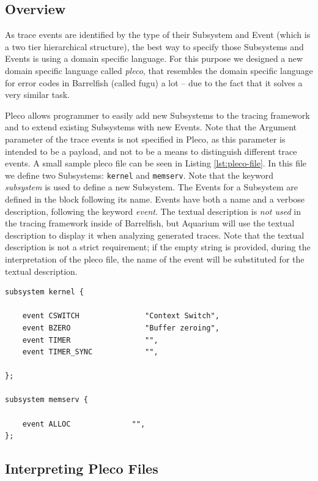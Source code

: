 \documentclass[a4paper,11pt,twoside]{report}
\begin{document}
\subsection{Overview}

As trace events are identified by the type of their Subsystem and Event (which
is a two tier hierarchical structure), the best way to specify those Subsystems
and Events is using a domain specific language. For this purpose we designed a
new domain specific language called \emph{pleco}, that resembles the domain
specific language for error codes in Barrelfish (called fugu) a lot -- due to
the fact that it solves a very similar task.

Pleco allows programmer to easily add new Subsystems to the tracing framework
and to extend existing Subsystems with new Events. Note that the Argument
parameter of the trace events is not specified in Pleco, as this parameter is
intended to be a payload, and not to be a means to distinguish different trace
events. A small sample pleco file can be seen in Listing
\ref{lst:pleco-file}. In this file we define two Subsystems: \texttt{kernel} and
\texttt{memserv}. Note that the keyword \emph{subsystem} is used to define a new
Subsystem. The Events for a Subsystem are defined in the block following its
name. Events have both a name and a verbose description, following the keyword
\emph{event}. The textual description is \emph{not used} in the tracing framework
inside of Barrelfish, but Aquarium will use the textual description to display
it when analyzing generated traces. Note that the textual description is not a
strict requirement; if the empty string is provided, during the interpretation
of the pleco file, the name of the event will be substituted for the textual
description.

\begin{code}
\begin{lstlisting}[frame=single, caption={A small example pleco file with two
	Subsystems.}, label={lst:pleco-file}]
subsystem kernel {

	event CSWITCH               "Context Switch",
	event BZERO                 "Buffer zeroing",
	event TIMER                 "", 
	event TIMER_SYNC            "", 

};

subsystem memserv {

	event ALLOC	             "", 
};
\end{lstlisting}
\end{code}

\subsection{Interpreting Pleco Files}
\end{document}

